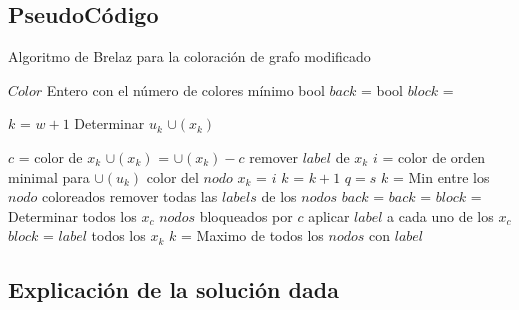 \documentclass[a4paper,10pt]{article}
\begin{document}
\subsection{PseudoCódigo}
\begin{algorithm}                      %
\caption{Algoritmo de Brelaz para la coloración de grafo modificado}          %
\label{Problema 1}                           %
\begin{algorithmic}[1]                    %
    \ENSURE $Color$ Entero con el número de colores mínimo
    \STATE  bool $back$ = \FALSE
    \STATE bool $block$ = \FALSE
    
    \STATE $k$ = $w + 1$
			\STATE Determinar  $u_k$ \AND  $\cup(x_k)$
								
 			\ENDFOR
 		\ELSE
 			\STATE $c$ = color de $x_k$
 			\STATE $\cup(x_k)$ = $\cup(x_k)-{c}$
 			\STATE remover $label$ de $x_k$
		\ENDIF    	 
    		\STATE $i$ = color de orden minimal para $\cup(u_k)$
				\STATE color del $nodo$ $x_k$ = $i$
				\STATE $k$ = $k+1$
					\STATE $q = s$
					\STATE {}
    					\STATE {}
    				\ENDIF
    				\STATE $k$ = Min entre los $nodo$ coloreados
    				\STATE remover todas las $labels$ de los $nodos$
    			\ELSE
    				\STATE $back$ = \FALSE
    			\ENDIF
    		\ELSE
    			\STATE $back$ = \TRUE
    			\STATE $block$ = \TRUE    			
    		\ENDIF
    	\ENDIF
					\STATE Determinar todos los $x_c$ $nodos$ bloqueados por $c$ \AND aplicar $label$ a cada uno de los $x_c$
					\STATE $block$ = \FALSE 
				\ENDFOR
			\ENDIF
			\STATE $label$ todos los $x_k$
			\STATE $k$ = Maximo de todos los $nodos$ con $label$
				\STATE {}
			\ENDIF			
		\ENDIF				   		    		    	
    \ENDWHILE
\end{algorithmic}
\end{algorithm}

\subsection{Explicación de la solución dada}
\hspace{2cm}
\end{document}
